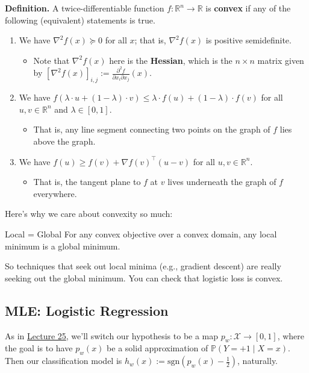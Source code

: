 \textbf{Definition.}
A twice-differentiable function
$f \colon \mathbb{R}^n \to \mathbb{R}$ is \textbf{convex}
if any of the following (equivalent) statements is true.
\begin{enumerate}
    \item We have $\nabla^2 f(x) \succeq 0$ for all $x$;
    that is, $\nabla^2 f(x)$ is positive semidefinite.
    \begin{itemize}
        \item Note that $\nabla^2 f(x)$ here is the \textbf{Hessian},
        which is the $n \times n$ matrix given by
        $\left[\nabla^2 f(x)\right]_{i, j} :=
        \frac{\partial^2 f}{\partial x_i \partial x_j}(x)$.
    \end{itemize}
    \item We have $f\left(\lambda \cdot u + (1 - \lambda) \cdot v\right)
    \leq \lambda \cdot f(u) + (1 - \lambda) \cdot f(v)$
    for all $u, v \in \mathbb{R}^n$ and $\lambda \in [0, 1]$.
    \begin{itemize}
        \item That is, any line segment connecting two points
        on the graph of $f$ lies above the graph.
    \end{itemize}
    \item We have $f(u) \geq f(v) + \nabla f(v)^{\top}(u - v)$
    for all $u, v \in \mathbb{R}^n$.
    \begin{itemize}
        \item That is, the tangent plane to $f$ at $v$
        lives underneath the graph of $f$ everywhere.
    \end{itemize}
\end{enumerate}

Here's why we care about convexity so much:

\begin{theorem}{Local = Global}
    For any convex objective over a convex domain,
    any local minimum is a global minimum.
\end{theorem}

So techniques that seek out local minima (e.g., gradient descent)
are really seeking out the global minimum.
You can check that logistic loss is convex.

\subsection{MLE: Logistic Regression}

As in \href{/18.650/lectures/25/}{Lecture 25},
we'll switch our hypothesis to be a map
$p_w \colon \mathcal{X} \to [0, 1]$,
where the goal is to have
$p_w(x)$ be a solid approximation of $\mathbb{P}(Y = +1 \mid X = x)$.
Then our classification model is
$h_w(x) := \mathrm{sgn}\left(p_w(x) - \frac{1}{2}\right)$, naturally.

